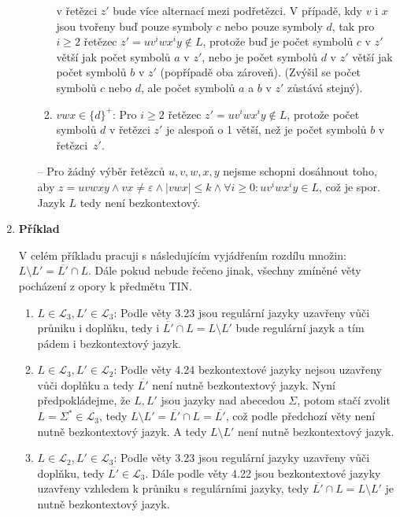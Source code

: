 \documentclass[a4paper,12pt]{article}
\begin{document}
\begin{enumerate}[label=\textbf{\arabic*}.]
\begin{itemize}
\begin{enumerate}
      v řetězci $z'$ bude více alternací mezi podřetězci. V případě, kdy $v$ i $x$ jsou tvořeny buď pouze symboly $c$ nebo pouze symboly $d$, tak 
      pro $i \geq 2$ řetězec $z' = uv^iwx^iy \notin L$, protože buď je počet symbolů $c$ v $z'$ větší jak počet symbolů $a$ v $z'$, nebo je počet 
      symbolů $d$ v $z'$ větší jak počet symbolů $b$ v $z'$ (popřípadě oba zároveň). 
      (Zvýšil se počet symbolů $c$ nebo $d$, ale počet symbolů $a$ a $b$ v $z'$ zůstává stejný).
    \item $vwx \in \{d\}^+$: Pro $i \geq 2$ řetězec 
      $z' = uv^iwx^iy \notin L$, protože počet symbolů $d$ v řetězci $z'$ je alespoň o 1 větší, než je počet symbolů $b$ v řetězci~$z'$.
   \end{enumerate}
   \item[--] Pro žádný výběr řetězců $u, v, w, x, y$ nejsme schopni dosáhnout toho, aby $z = uvwxy \wedge vx \neq\varepsilon \wedge |vwx| \leq k \wedge \forall i \geq 0: uv^iwx^iy\in L$, což je spor.
   Jazyk $L$ tedy není bezkontextový.
  \end{itemize}
 
 
 \item {\bfseries Příklad}
 
  V celém příkladu pracuji s následujícím vyjádřením rozdílu množin: $L\setminus L' = \overline{L'}\cap L$.
  Dále pokud nebude řečeno jinak, všechny zmíněné věty pocházení z opory k předmětu TIN.
  \begin{enumerate}
   \item $L \in\mathcal{L}_3, L' \in\mathcal{L}_3$: Podle věty 3.23 jsou regulární jazyky uzavřeny vůči průniku
    i doplňku, tedy i $\overline{L'}\cap L = L\setminus L'$ bude regulární jazyk a tím pádem i bezkontextový jazyk.
    
   \item $L \in\mathcal{L}_3, L' \in\mathcal{L}_2$: Podle věty 4.24 bezkontextové jazyky nejsou uzavřeny vůči doplňku
    a tedy $\overline{L'}$ není nutně bezkontextový jazyk. Nyní předpokládejme, že $L, L'$ jsou jazyky nad abecedou $\Sigma$, potom stačí zvolit $L = \Sigma^* \in\mathcal{L}_3$, 
    tedy $L\setminus L' = \overline{L'}\cap L = \overline{L'}$, což podle předchozí věty není nutně bezkontextový jazyk. A tedy $L\setminus L'$ není
    nutně bezkontextový jazyk. 
    
   \item $L \in\mathcal{L}_2, L' \in\mathcal{L}_3$: Podle  věty 3.23 jsou regulární jazyky uzavřeny vůči doplňku, tedy 
    $\overline{L'}\in\mathcal{L}_3$. Dále podle věty 4.22 jsou bezkontextové jazyky uzavřeny vzhledem k průniku s regulárními
    jazyky, tedy $\overline{L'}\cap L = L\setminus L'$ je nutně bez\-kon\-textový jazyk.
    

\end{enumerate}
\end{enumerate}
\end{document}
